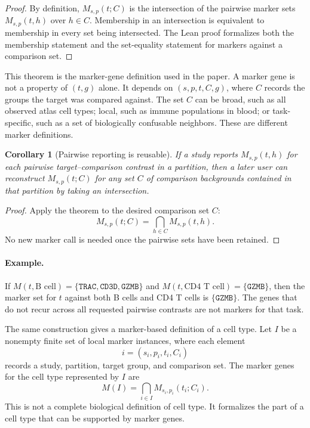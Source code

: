 \documentclass{article}
\newtheorem{corollary}{Corollary}
\begin{document}
\begin{proof}
By definition, $M_{s,p}(t;C)$ is the intersection of the pairwise marker sets $M_{s,p}(t,h)$ over $h\in C$. Membership in an intersection is equivalent to membership in every set being intersected. The Lean proof formalizes both the membership statement and the set-equality statement for markers against a comparison set.
\end{proof}

This theorem is the marker-gene definition used in the paper. A marker gene is not a property of $(t,g)$ alone. It depends on $(s,p,t,C,g)$, where $C$ records the groups the target was compared against. The set $C$ can be broad, such as all observed atlas cell types; local, such as immune populations in blood; or task-specific, such as a set of biologically confusable neighbors. These are different marker definitions.

\begin{corollary}[Pairwise reporting is reusable]\label{cor:pairwise-reporting-reusable}
If a study reports $M_{s,p}(t,h)$ for each pairwise target--comparison contrast in a partition, then a later user can reconstruct $M_{s,p}(t;C)$ for any set $C$ of comparison backgrounds contained in that partition by taking an intersection.
\end{corollary}

\begin{proof}
Apply the theorem to the desired comparison set $C$:
\[
  M_{s,p}(t;C)=\bigcap_{h\in C}M_{s,p}(t,h).
\]
No new marker call is needed once the pairwise sets have been retained.
\end{proof}

\paragraph{Example.}
If $M(t,\text{B cell})=\{\texttt{TRAC},\texttt{CD3D},\texttt{GZMB}\}$ and $M(t,\text{CD4 T cell})=\{\texttt{GZMB}\}$, then the marker set for $t$ against both B cells and CD4 T cells is $\{\texttt{GZMB}\}$. The genes that do not recur across all requested pairwise contrasts are not markers for that task.

The same construction gives a marker-based definition of a cell type. Let $I$ be a nonempty finite set of local marker instances, where each element
\[
  i=(s_i,p_i,t_i,C_i)
\]
records a study, partition, target group, and comparison set. The marker genes for the cell type represented by $I$ are
\[
  M(I)=\bigcap_{i\in I} M_{s_i,p_i}(t_i;C_i).
\]
This is not a complete biological definition of cell type. It formalizes the part of a cell type that can be supported by marker genes.
\end{document}
